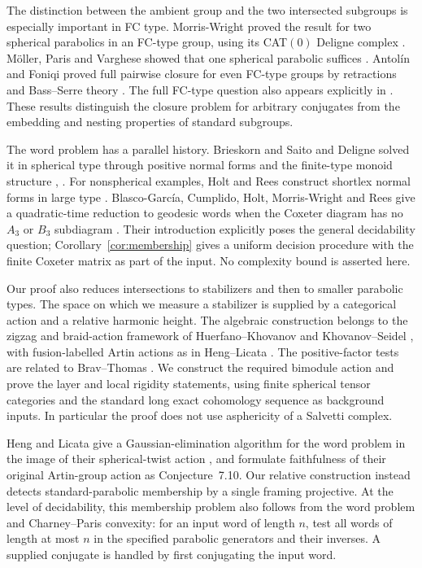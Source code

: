 The distinction between the ambient group and the two intersected
subgroups is especially important in FC type.  Morris-Wright proved
the result for two spherical parabolics in an FC-type group, using its
CAT$(0)$ Deligne complex \cite[Theorem~3.1]{MorrisWright2021}.
M\"oller, Paris and Varghese showed that one spherical parabolic suffices
\cite[Corollary~1.2]{MoellerParisVarghese2024}.
Antol\'in and Foniqi proved full pairwise closure for even FC-type groups
by retractions and Bass--Serre theory
\cite[Theorem~1.1]{AntolinFoniqi2022}.
The full FC-type question also appears explicitly in
\cite[Question~3.6]{CharneyMartinMorrisWright2026}.
These results distinguish the closure problem for arbitrary conjugates
from the embedding and nesting properties of standard subgroups.

The word problem has a parallel history. Brieskorn and Saito and
Deligne solved it in spherical type through positive normal forms
and the finite-type monoid structure
\cite[Section~6, especially Theorem~6.6]{BrieskornSaito1972},
\cite[Section~4.20]{Deligne1972}.
For nonspherical examples, Holt and Rees construct shortlex normal
forms in large type \cite[Theorem~3.2]{HoltRees2012}.
Blasco-Garc\'ia, Cumplido, Holt, Morris-Wright and Rees give a
quadratic-time reduction to geodesic words when the Coxeter diagram
has no $A_3$ or $B_3$ subdiagram
\cite[Theorem~1.1]{BlascoGarciaEtAl2026}.
Their introduction explicitly poses the general decidability question;
Corollary~\ref{cor:membership} gives a uniform decision procedure with
the finite Coxeter matrix as part of the input. No complexity bound
is asserted here.

Our proof also reduces intersections to stabilizers and then to smaller
parabolic types.  The space on which we measure a stabilizer is supplied
by a categorical action and a relative harmonic height.  The algebraic
construction belongs to the zigzag and braid-action framework of
Huerfano--Khovanov and Khovanov--Seidel
\cite{HuerfanoKhovanov2001,KhovanovSeidel2002}, with fusion-labelled
Artin actions as in Heng--Licata \cite{HengLicata2024}.
The positive-factor tests are related to Brav--Thomas
\cite{BravThomas2011}.  We construct the required bimodule action and prove the layer and local
rigidity statements, using finite spherical tensor categories and the
standard long exact cohomology sequence as background inputs.  In particular the proof does not use
asphericity of a Salvetti complex.

Heng and Licata give a Gaussian-elimination algorithm for the word
problem in the image of their spherical-twist action
\cite[Proposition~7.11]{HengLicata2024}, and formulate faithfulness
of their original Artin-group action as Conjecture~7.10.
Our relative construction instead detects standard-parabolic
membership by a single framing projective. At the level of decidability,
this membership problem also follows from the word problem and
Charney--Paris convexity: for an input word of length $n$, test all
words of length at most $n$ in the specified parabolic generators and
their inverses. A supplied conjugate is handled by first conjugating
the input word.

